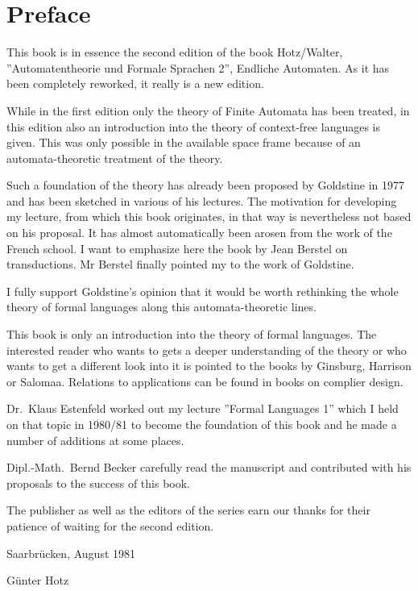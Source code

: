 \chapter*{Preface}

This book is in essence the second edition of the book Hotz/Walter,
''Automatentheorie und Formale Sprachen 2'', Endliche Automaten. As it has been
completely reworked, it really is a new edition.

While in the first edition only the theory of Finite Automata has been treated,
in this edition also an introduction into the theory of context-free languages
is given. This was only possible in the available space frame because
of an automata-theoretic treatment of the theory.

Such a foundation of the theory has already been proposed by Goldstine in 1977
and has been sketched in various of his lectures. The motivation for developing
my lecture, from which this book originates, in that way is nevertheless not
based on his proposal. It has almost automatically been arosen from the
work of the French school. I want to emphasize here the book by Jean Berstel on
transductions. Mr Berstel finally pointed my to the work of Goldstine.

I fully support Goldstine's opinion that it would be worth rethinking the whole
theory of formal languages along this automata-theoretic lines.

This book is only an introduction into the theory of formal languages. The
interested reader who wants to gets a deeper understanding of the theory or who
wants to get a different look into it is pointed to the books by Ginsburg,
Harrison or Salomaa. Relations to applications can be found in books on complier
design.

Dr.\ Klaus Estenfeld worked out my lecture ''Formal Languages 1'' which I held
on that topic in 1980/81 to become the foundation of this book and he made a number
of additions at some places.

Dipl.-Math.\ Bernd Becker carefully read the manuscript and contributed with his
proposals to the success of this book.

The publisher as well as the editors of the series earn our thanks for their
patience of waiting for the second edition.

\vspace{2ex}

Saarbr\"ucken, August 1981

\vspace{0.5cm}

G\"unter Hotz
